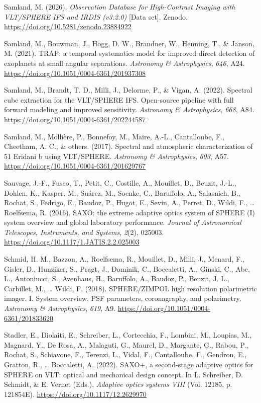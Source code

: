 \documentclass[
]{article}
\newlength{\cslhangindent}
\newenvironment{CSLReferences}[2] %
 {\begin{list}{}{%
  \setlength{\itemindent}{0pt}
  \setlength{\leftmargin}{0pt}
  \setlength{\parsep}{0pt}
  \ifodd #1
   \setlength{\leftmargin}{\cslhangindent}
   \setlength{\itemindent}{-1\cslhangindent}
  \fi
  \setlength{\itemsep}{#2\baselineskip}}}
 {\end{list}}
\begin{document}
\begin{CSLReferences}{1}{0}
Samland, M. (2026). \emph{{Observation Database for High-Contrast
Imaging with VLT/SPHERE IFS and IRDIS (v3.2.0)}} {[}Data set{]}. Zenodo.
\url{https://doi.org/10.5281/zenodo.23884922}

Samland, M., Bouwman, J., Hogg, D. W., Brandner, W., Henning, T., \&
Janson, M. (2021). {TRAP: a temporal systematics model for improved
direct detection of exoplanets at small angular separations}.
\emph{Astronomy \& Astrophysics}, \emph{646}, A24.
\url{https://doi.org/10.1051/0004-6361/201937308}

Samland, M., Brandt, T. D., Milli, J., Delorme, P., \& Vigan, A. (2022).
{Spectral cube extraction for the VLT/SPHERE IFS. Open-source pipeline
with full forward modeling and improved sensitivity}. \emph{Astronomy \&
Astrophysics}, \emph{668}, A84.
\url{https://doi.org/10.1051/0004-6361/202244587}

Samland, M., Mollière, P., Bonnefoy, M., Maire, A.-L., Cantalloube, F.,
Cheetham, A. C., \& others. (2017). {Spectral and atmospheric
characterization of 51 Eridani b using VLT/SPHERE}. \emph{Astronomy \&
Astrophysics}, \emph{603}, A57.
\url{https://doi.org/10.1051/0004-6361/201629767}

Sauvage, J.-F., Fusco, T., Petit, C., Costille, A., Mouillet, D.,
Beuzit, J.-L., Dohlen, K., Kasper, M., Suárez, M., Soenke, C.,
Baruffolo, A., Salasnich, B., Rochat, S., Fedrigo, E., Baudoz, P.,
Hugot, E., Sevin, A., Perret, D., Wildi, F., \ldots{} Roelfsema, R.
(2016). {SAXO: the extreme adaptive optics system of SPHERE (I) system
overview and global laboratory performance}. \emph{Journal of
Astronomical Telescopes, Instruments, and Systems}, \emph{2}(2), 025003.
\url{https://doi.org/10.1117/1.JATIS.2.2.025003}

Schmid, H. M., Bazzon, A., Roelfsema, R., Mouillet, D., Milli, J.,
Menard, F., Gisler, D., Hunziker, S., Pragt, J., Dominik, C.,
Boccaletti, A., Ginski, C., Abe, L., Antoniucci, S., Avenhaus, H.,
Baruffolo, A., Baudoz, P., Beuzit, J. L., Carbillet, M., \ldots{} Wildi,
F. (2018). {SPHERE/ZIMPOL high resolution polarimetric imager. I. System
overview, PSF parameters, coronagraphy, and polarimetry}.
\emph{Astronomy \& Astrophysics}, \emph{619}, A9.
\url{https://doi.org/10.1051/0004-6361/201833620}

Stadler, E., Diolaiti, E., Schreiber, L., Cortecchia, F., Lombini, M.,
Loupias, M., Magnard, Y., De Rosa, A., Malaguti, G., Maurel, D.,
Morgante, G., Rabou, P., Rochat, S., Schiavone, F., Terenzi, L., Vidal,
F., Cantalloube, F., Gendron, E., Gratton, R., \ldots{} Boccaletti, A.
(2022). {SAXO+, a second-stage adaptive optics for SPHERE on VLT:
optical and mechanical design concept}. In L. Schreiber, D. Schmidt, \&
E. Vernet (Eds.), \emph{Adaptive optics systems VIII} (Vol. 12185, p.
121854E). \url{https://doi.org/10.1117/12.2629970}


\end{CSLReferences}
\end{document}
